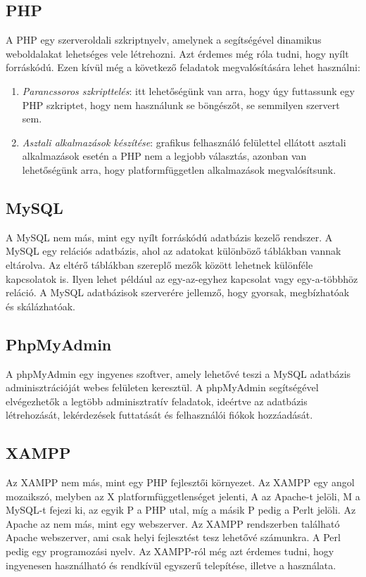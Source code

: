 \documentclass[]{thesis-ekf}
\theoremstyle{definition}
\theoremstyle{remark}
\begin{document}
	\subsection{PHP}
		A PHP egy szerveroldali szkriptnyelv, amelynek a segítségével dinamikus weboldalakat lehetséges vele létrehozni. Azt érdemes még róla tudni, hogy nyílt forráskódú. Ezen kívül még a következő feladatok megvalósítására lehet használni:
		\begin{enumerate}
			\item \emph{Parancssoros szkripttelés}: itt lehetőségünk van arra, hogy úgy futtassunk egy PHP szkriptet, hogy nem használunk se böngészőt, se semmilyen szervert sem.
			\item \emph{Asztali alkalmazások készítése}: grafikus felhasználó felülettel ellátott asztali alkalmazások esetén a PHP nem a legjobb választás, azonban van lehetőségünk arra, hogy platformfüggetlen alkalmazások megvalósítsunk.
		\end{enumerate}
		\cite{PHP}
	\subsection{MySQL}
		A MySQL nem más, mint egy nyílt forráskódú adatbázis kezelő rendszer. A MySQL egy relációs adatbázis, ahol az adatokat különböző táblákban vannak eltárolva. Az eltérő táblákban szereplő mezők között lehetnek különféle kapcsolatok is. Ilyen lehet például az egy-az-egyhez kapcsolat vagy egy-a-többhöz reláció. A MySQL adatbázisok szerverére jellemző, hogy gyorsak, megbízhatóak és skálázhatóak.
		\cite{MySQL}
	\subsection{PhpMyAdmin}
		A phpMyAdmin egy ingyenes szoftver, amely lehetővé teszi a MySQL adatbázis adminisztrációját webes felületen keresztül. A phpMyAdmin segítségével elvégezhetők a legtöbb adminisztratív feladatok, ideértve az adatbázis létrehozását, lekérdezések futtatását és felhasználói fiókok hozzáadását. \cite{PhpMyAdmin}
	\subsection{XAMPP}
		Az XAMPP nem más, mint egy PHP fejlesztői környezet. Az XAMPP egy angol mozaikszó, melyben az X platformfüggetlenséget jelenti, A az Apache-t jelöli, M a MySQL-t fejezi ki, az egyik P a PHP utal, míg a másik P pedig a Perlt jelöli. Az Apache az nem más, mint egy webszerver. Az XAMPP rendszerben található Apache webszerver, ami csak helyi fejlesztést tesz lehetővé számunkra. A Perl pedig egy programozási nyelv. Az XAMPP-ról még azt érdemes tudni, hogy ingyenesen használható és rendkívül egyszerű telepítése, illetve a használata. \cite{XAMPP}
\end{document}
